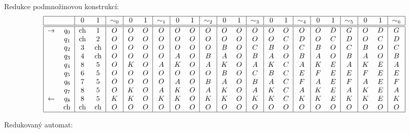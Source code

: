 Redukce podmnožinovou konstrukcí:
\[
\begin{tabular}{|r r|c c|c|c c|c|c c|c|c c|c|c c|c|c c|c|c c| c|}
    \hline
    & & $0$ & $1$ & $\sim_0$ & $0$ & $1$ & $\sim_1$ & $0$ & $1$ & $\sim_2$ & $0$ & $1$ & $\sim_3$ & $0$ & $1$ & $\sim_4$ & $0$ & $1$ & $\sim_5$ & $0$ & $1$ & $\sim_6$ \\ \hline \hline
    $\rightarrow$ & $q_0$ & ch &$1$ &$O$ &$O$ &$O$ &$O$ &$O$ &$O$ &$O$ &$O$ &$O$ &$O$ &$O$ &$O$ &$O$ &$O$ &$D$ &$G$ &$O$ &$D$ &$G$\\
              & $q_1$ & ch &$2$ &$O$ &$O$ &$O$ &$O$ &$O$ &$O$ &$O$ &$O$ &$O$ &$O$ &$O$ &$C$ &$D$ &$O$ &$C$ &$D$ &$O$ &$C$ &$D$\\
              & $q_2$ &$3$ & ch &$O$ &$O$ &$O$ &$O$ &$O$ &$O$ &$O$ &$B$ &$O$ &$C$ &$B$ &$O$ &$C$ &$B$ &$O$ &$C$ &$B$ &$O$ &$C$\\
              & $q_3$ &$4$ & ch &$O$ &$O$ &$O$ &$O$ &$A$ &$O$ &$B$ &$A$ &$O$ &$B$ &$A$ &$O$ &$B$ &$A$ &$O$ &$B$ &$A$ &$O$ &$B$\\
              & $q_4$ &$8$ &$5$ &$O$ &$K$ &$O$ &$A$ &$K$ &$O$ &$A$ &$K$ &$O$ &$A$ &$K$ &$C$ &$A$ &$K$ &$E$ &$A$ &$K$ &$E$ &$A$\\
              & $q_5$ &$6$ &$5$ &$O$ &$O$ &$O$ &$O$ &$O$ &$O$ &$O$ &$B$ &$O$ &$C$ &$B$ &$C$ &$E$ &$F$ &$E$ &$E$ &$F$ &$E$ &$E$\\
              & $q_6$ &$7$ &$5$ &$O$ &$O$ &$O$ &$O$ &$A$ &$O$ &$B$ &$A$ &$O$ &$B$ &$A$ &$C$ &$F$ &$A$ &$E$ &$F$ &$A$ &$E$ &$F$\\
              & $q_7$ &$8$ &$5$ &$O$ &$K$ &$O$ &$A$ &$K$ &$O$ &$A$ &$K$ &$O$ &$A$ &$K$ &$C$ &$A$ &$K$ &$E$ &$A$ &$K$ &$E$ &$A$\\
    $\leftarrow$  & $q_8$ &$8$ &$5$ &$K$ &$K$ &$O$ &$K$ &$K$ &$O$ &$K$ &$K$ &$O$ &$K$ &$K$ &$C$ &$K$ &$K$ &$E$ &$K$ &$K$ &$E$ &$K$\\
              &  ch   & ch & ch &$O$ &$O$ &$O$ &$O$ &$O$ &$O$ &$O$ &$O$ &$O$ &$O$ &$O$ &$O$ &$O$ &$O$ &$O$ &$O$ &$O$ &$O$ &$O$\\
    \hline
\end{tabular}
\]

Redukovaný automat:

